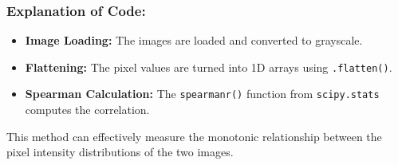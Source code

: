 \documentclass[11pt]{article}
\begin{document}
\subsubsection{Explanation of Code:}
\label{sec:orgbdab6b0}
\begin{itemize}
\item \textbf{Image Loading:} The images are loaded and converted to grayscale.
\item \textbf{Flattening:} The pixel values are turned into 1D arrays using \texttt{.flatten()}.
\item \textbf{Spearman Calculation:} The \texttt{spearmanr()} function from \texttt{scipy.stats} computes the correlation.
\end{itemize}

This method can effectively measure the monotonic relationship between the pixel intensity distributions of the two images.
\end{document}
